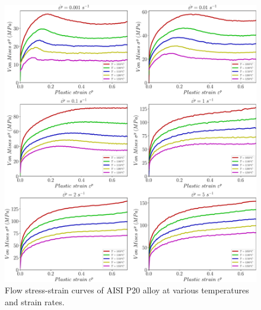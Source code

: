 \documentclass[twoside,english,1p,final,sort&compress]{elsarticle}
\theoremstyle{plain}
\begin{document}
\begin{figure}[!ht]
\centering
\includegraphics[width=1.02\columnwidth]{Figures/rawData}
\caption{Flow stress-strain curves of AISI P20 alloy at various temperatures and strain rates.}
\label{fig:RawData}
\end{figure}
\end{document}
